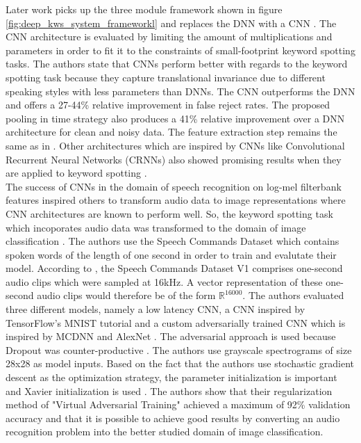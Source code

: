 \documentclass{article}
\theoremstyle{definition}
\theoremstyle{remark}
\begin{document}
Later work picks up the three module framework shown in figure \ref{fig:deep_kws_system_frameworkl} and replaces the DNN with a CNN \cite{sainath2015convolutional}. The CNN architecture is evaluated by limiting the amount of multiplications and parameters in order to fit it to the constraints of small-footprint keyword spotting tasks. The authors state that CNNs perform better with regards to the keyword spotting task because they capture translational invariance due to different speaking styles with less parameters than DNNs. The CNN outperforms the DNN and offers a 27-44\% relative improvement in false reject rates. The proposed pooling in time strategy also produces a 41\% relative improvement over a DNN architecture for clean and noisy data. The feature extraction step remains the same as in \cite{chen2014small}. Other architectures which are inspired by CNNs like Convolutional Recurrent Neural Networks (CRNNs) also showed promising results when they are applied to keyword spotting \cite{arik2017convolutional}.\\

The success of CNNs in the domain of speech recognition on log-mel filterbank features inspired others to transform audio data to image representations where CNN architectures are known to perform well. So, the keyword spotting task which incoporates audio data was transformed to the domain of image classification \cite{gouda2018speech}. The authors use the Speech Commands Dataset \cite{warden2018speech} which contains spoken words of the length of one second in order to train and evalutate their model. According to \cite{warden2018speech}, the Speech Commands Dataset V1 \cite{scd_v1} comprises one-second audio clips which were sampled at 16kHz. A vector representation of these one-second audio clips would therefore be of the form  $\mathbb{R}^{16000}$. The authors evaluated three different models, namely a low latency CNN, a CNN inspired by TensorFlow's MNIST tutorial and a custom adversarially trained CNN which is inspired by MCDNN \cite{cirecsan2012multi} and AlexNet \cite{krizhevsky2012imagenet}. The adversarial approach is used because Dropout was counter-productive \cite{goodfellow2016deep}. The authors use grayscale spectrograms of size 28x28 as  model inputs. Based on the fact that the authors use stochastic gradient descent as the optimization strategy, the parameter initialization is important and Xavier initialization is used \cite{glorot2010understanding}. The authors show that their regularization method of "Virtual Adversarial Training" achieved a maximum of 92\% validation accuracy and that it is possible to achieve good results by converting an audio recognition problem into the better studied domain of image classification.\\
\end{document}
